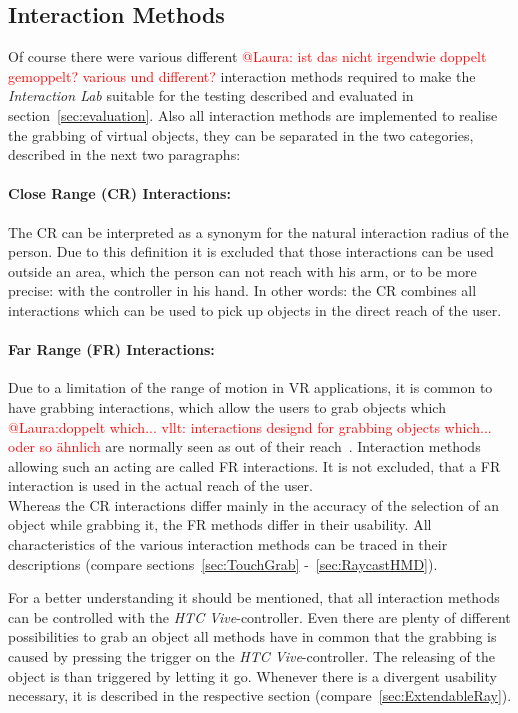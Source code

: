 \subsection{Interaction Methods}\label{sec:Interactions}
Of course there were various different \textcolor{red}{@Laura: ist das nicht irgendwie doppelt gemoppelt? various und different?} interaction methods required to make the \textit{Interaction Lab} suitable for the testing described and evaluated in section~\ref{sec:evaluation}. Also all interaction methods are implemented to realise the grabbing of virtual objects, they can be separated in the two categories, described in the next two paragraphs:

\paragraph{Close Range (CR) Interactions:} The CR can be interpreted as a synonym for the natural interaction radius of the person. Due to this definition it is excluded that those interactions can be used outside an area, which the person can not reach with his arm, or to be more precise: with the controller in his hand. In other words: the CR combines all interactions which can be used to pick up objects in the direct reach of the user.

\paragraph{Far Range (FR) Interactions:} Due to a limitation of the range of motion in VR applications, it is common to have grabbing interactions, which allow the users to grab objects which \textcolor{red}{@Laura:doppelt which... vllt: interactions designd for grabbing objects which... oder so ähnlich} are normally seen as out of their reach~\cite{VRBook}. Interaction methods allowing such an acting are called FR interactions. It is not excluded, that a FR interaction is used in the actual reach of the user. \\

Whereas the CR interactions differ mainly in the accuracy of the selection of an object while grabbing it, the FR methods differ in their usability. All characteristics of the various interaction methods can be traced in their descriptions (compare sections~\ref{sec:TouchGrab} -~\ref{sec:RaycastHMD}).

For a better understanding it should be mentioned, that all interaction methods can be controlled with the \textit{HTC Vive}-controller. Even there are plenty of different possibilities to grab an object all methods have in common that the grabbing is caused by pressing the trigger on the \textit{HTC Vive}-controller. The releasing of the object is than triggered by letting it go. Whenever there is a divergent usability necessary, it is described in the respective section (compare~\ref{sec:ExtendableRay}).

